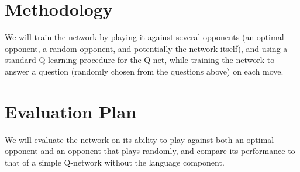 \documentclass[11pt]{article}
\begin{document}
\section{Methodology}
We will train the network by playing it against several opponents (an optimal opponent, a random opponent, and potentially the network itself), and using a standard Q-learning procedure for the Q-net, while training the network to answer a question (randomly chosen from the questions above) on each move.

\section{Evaluation Plan}
We will evaluate the network on its ability to play against both an optimal opponent and an opponent that plays randomly, and compare its performance to that of a simple Q-network without the language component.



\end{document}
